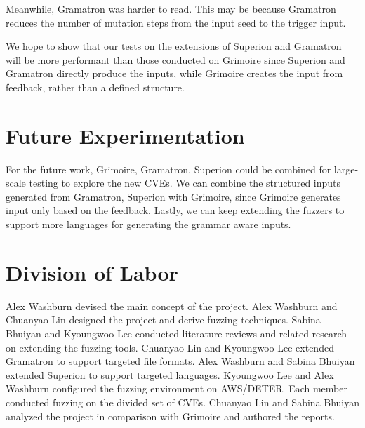 \documentclass[12pt]{diazessay}
\begin{document}
Meanwhile, Gramatron was harder to read. This may be because Gramatron reduces the number of mutation steps from the input seed to the trigger input. 

We hope to show that our tests on the extensions of Superion and Gramatron will be more performant than those conducted on Grimoire since Superion and Gramatron directly produce the inputs, while Grimoire creates the input from feedback, rather than a defined structure.

\section*{Future Experimentation}
For the future work, Grimoire, Gramatron, Superion could be combined for large-scale testing to explore the new CVEs. 
We can combine the structured inputs generated from Gramatron, Superion with Grimoire, since Grimoire generates input only based on the feedback.
Lastly, we can keep extending the fuzzers to support more languages for generating the grammar aware inputs.

\section*{Division of Labor}

Alex Washburn devised the main concept of the project.
Alex Washburn and Chuanyao Lin designed the project and derive fuzzing techniques.
Sabina Bhuiyan and Kyoungwoo Lee conducted literature reviews and related research on extending the fuzzing tools.
Chuanyao Lin and Kyoungwoo Lee extended Gramatron to support targeted file formats.
Alex Washburn and Sabina Bhuiyan extended Superion to support targeted languages.
Kyoungwoo Lee and Alex Washburn configured the fuzzing environment on AWS/DETER.
Each member conducted fuzzing on the divided set of CVEs.
Chuanyao Lin and Sabina Bhuiyan analyzed the project in comparison with Grimoire and authored the reports.

\clearpage


\end{document}
